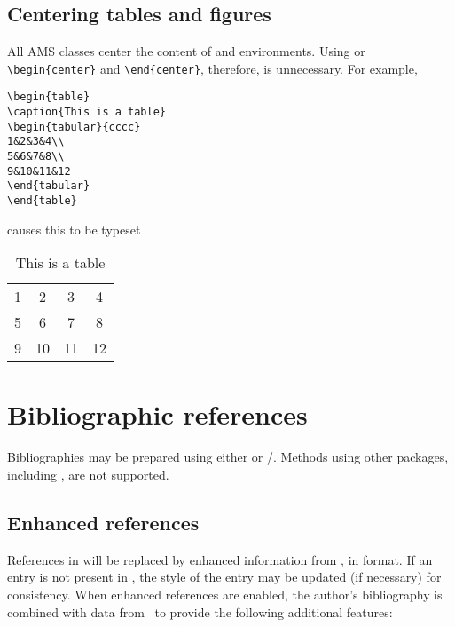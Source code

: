 \ifjournal
 \enlargethispage{1.5\baselineskip}
\fi

\subsection{Centering tables and figures}

All AMS classes center the content of  and  environments. Using  or
\verb+\begin{center}+ and \verb+\end{center}+, therefore, is unnecessary. For example,

\begin{verbatim}
\begin{table}
\caption{This is a table}
\begin{tabular}{cccc}
1&2&3&4\\
5&6&7&8\\
9&10&11&12
\end{tabular}
\end{table}
\end{verbatim}

\noindent causes this to be typeset

\begin{table}[h!]
\caption{This is a table}
\begin{tabular}{cccc}
1&2&3&4\\
5&6&7&8\\
9&10&11&12
\end{tabular}
\end{table}


\section{Bibliographic references}

Bibliographies may be prepared using either  or \bibtex/.
Methods using other packages, including , are not supported.

\ifmonograph
\else
\subsection{Enhanced references}\label{sec:bibref}

References in 
will be replaced by enhanced
information from \MSN, in  format.
If an entry is not present in \MSN, the style of the
entry may be updated (if necessary) for consistency.  When enhanced
references are enabled, the author's bibliography is combined with
data from \MSN\ to provide the following additional features:

